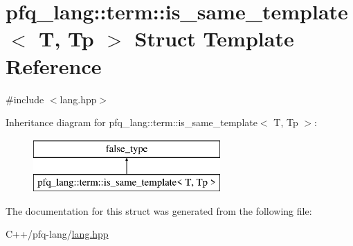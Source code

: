 \hypertarget{structpfq__lang_1_1term_1_1is__same__template}{\section{pfq\+\_\+lang\+:\+:term\+:\+:is\+\_\+same\+\_\+template$<$ T, Tp $>$ Struct Template Reference}
\label{structpfq__lang_1_1term_1_1is__same__template}
}


{\ttfamily \#include $<$lang.\+hpp$>$}

Inheritance diagram for pfq\+\_\+lang\+:\+:term\+:\+:is\+\_\+same\+\_\+template$<$ T, Tp $>$\+:\begin{figure}[H]
\begin{center}
\leavevmode
\includegraphics[height=2.000000cm]{structpfq__lang_1_1term_1_1is__same__template}
\end{center}
\end{figure}


The documentation for this struct was generated from the following file\+:\begin{DoxyCompactItemize}
\item 
C++/pfq-\/lang/\hyperlink{lang_8hpp}{lang.\+hpp}\end{DoxyCompactItemize}
